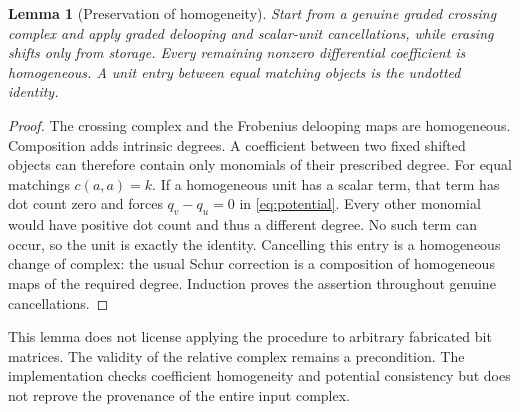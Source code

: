 \documentclass[11pt]{article}
\newtheorem{lemma}[theorem]{Lemma}
\theoremstyle{definition}
\theoremstyle{remark}
\begin{document}
\begin{lemma}[Preservation of homogeneity]\label{lem:homogeneity}
Start from a genuine graded crossing complex and apply graded delooping and
scalar-unit cancellations, while erasing shifts only from storage. Every
remaining nonzero differential coefficient is homogeneous. A unit entry
between equal matching objects is the undotted identity.
\end{lemma}
\begin{proof}
The crossing complex and the Frobenius delooping maps are homogeneous.
Composition adds intrinsic degrees. A coefficient between two fixed shifted
objects can therefore contain only monomials of their prescribed degree.
For equal matchings $c(a,a)=k$. If a homogeneous unit has a scalar term, that
term has dot count zero and forces $q_v-q_u=0$ in
\eqref{eq:potential}. Every other monomial would have positive dot count and
thus a different degree. No such term can occur, so the unit is exactly the
identity. Cancelling this entry is a homogeneous change of complex: the
usual Schur correction is a composition of homogeneous maps of the required
degree. Induction proves the assertion throughout genuine cancellations.
\end{proof}

This lemma does not license applying the procedure to arbitrary fabricated
bit matrices. The validity of the relative complex remains a precondition.
The implementation checks coefficient homogeneity and potential consistency
but does not reprove the provenance of the entire input complex.
\end{document}
